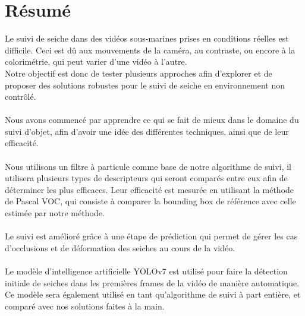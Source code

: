 \pagestyle{plain}
\chapter*{Résumé}
Le suivi de seiche dans des vidéos sous-marines prises en conditions réelles est difficile. Ceci est dû aux mouvements de la caméra, au contraste, ou encore à la colorimétrie, qui peut varier d'une vidéo à l'autre.\\
Notre objectif est donc de tester plusieurs approches afin d'explorer et de proposer des solutions robustes pour le suivi de seiche en environnement non contrôlé.\\
\\
Nous avons commencé par apprendre ce qui se fait de mieux dans le domaine du suivi d'objet, afin d'avoir une idée des différentes techniques, ainsi que de leur efficacité.\\
\\
Nous utilisons un filtre à particule comme base de notre algorithme de suivi, il utilisera plusieurs types de descripteurs qui seront comparés entre eux afin de déterminer les plus efficaces. Leur efficacité est mesurée en utilisant la méthode de Pascal VOC, qui consiste à comparer la bounding box de référence avec celle estimée par notre méthode.\\
\\
Le suivi est amélioré grâce à une étape de prédiction qui permet de gérer les cas d'occlusions et de déformation des seiches au cours de la vidéo.\\
\\
Le modèle d'intelligence artificielle YOLOv7 est utilisé pour faire la détection initiale de seiches dans les premières frames de la vidéo de manière automatique.\\
Ce modèle sera également utilisé en tant qu'algorithme de suivi à part entière, et comparé avec nos solutions faites à la main.\\


\clearpage
